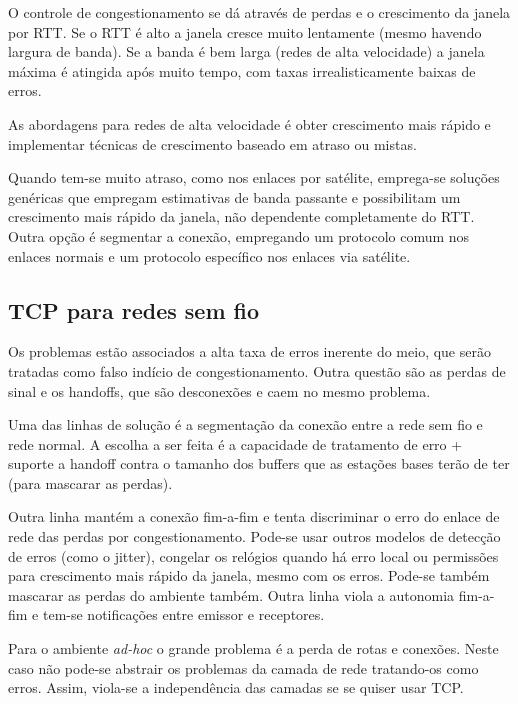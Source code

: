 O controle de congestionamento se dá através de perdas e o crescimento da janela por RTT.
Se o RTT é alto a janela cresce muito lentamente (mesmo havendo largura de banda).
Se a banda é bem larga (redes de alta velocidade) a janela máxima é atingida após muito tempo, com taxas irrealisticamente baixas de erros.

As abordagens para redes de alta velocidade é obter crescimento mais rápido e implementar técnicas de crescimento baseado em atraso ou mistas.

Quando tem-se muito atraso, como nos enlaces por satélite, emprega-se soluções genéricas que empregam estimativas de banda passante e possibilitam um crescimento mais rápido da janela, não dependente completamente do RTT.
Outra opção é segmentar a conexão, empregando um protocolo comum nos enlaces normais e um protocolo específico nos enlaces via satélite.

\subsection{TCP para redes sem fio}

Os problemas estão associados a alta taxa de erros inerente do meio, que serão tratadas como falso indício de congestionamento.
Outra questão são as perdas de sinal e os handoffs, que são desconexões e caem no mesmo problema.

Uma das linhas de solução é a segmentação da conexão entre a rede sem fio e rede normal.
A escolha a ser feita é a capacidade de tratamento de erro + suporte a handoff contra o tamanho dos buffers que as estações bases terão de ter (para mascarar as perdas).

Outra linha mantém a conexão fim-a-fim e tenta discriminar o erro do enlace de rede das perdas por congestionamento.
Pode-se usar outros modelos de detecção de erros (como o jitter), congelar os relógios quando há erro local ou permissões para crescimento mais rápido da janela, mesmo com os erros.
Pode-se também mascarar as perdas do ambiente também.
Outra linha viola a autonomia fim-a-fim e tem-se notificações entre emissor e receptores.

Para o ambiente \emph{ad-hoc} o grande problema é a perda de rotas e conexões.
Neste caso não pode-se abstrair os problemas da camada de rede tratando-os como erros.
Assim, viola-se a independência das camadas se se quiser usar TCP.

